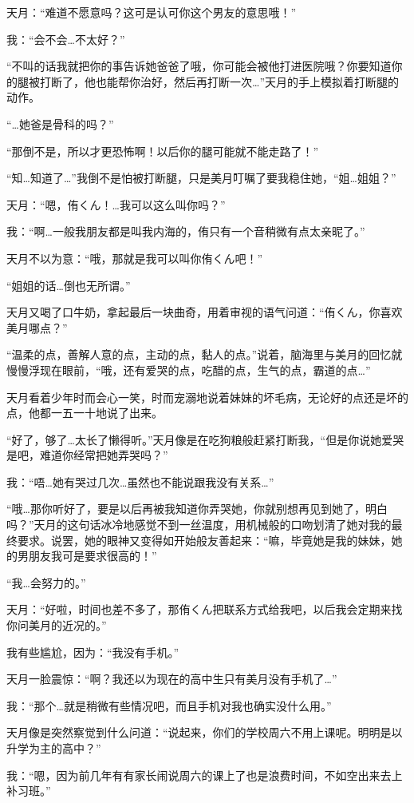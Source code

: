 天月：“难道不愿意吗？这可是认可你这个男友的意思哦！”

我：“会不会…不太好？”

“不叫的话我就把你的事告诉她爸爸了哦，你可能会被他打进医院哦？你要知道你的腿被打断了，他也能帮你治好，然后再打断一次…”天月的手上模拟着打断腿的动作。

“…她爸是骨科的吗？”

“那倒不是，所以才更恐怖啊！以后你的腿可能就不能走路了！”

“知…知道了…”我倒不是怕被打断腿，只是美月叮嘱了要我稳住她，“姐…姐姐？”

天月：“嗯，侑くん！…我可以这么叫你吗？”

我：“啊…一般我朋友都是叫我内海的，侑只有一个音稍微有点太亲昵了。”

天月不以为意：“哦，那就是我可以叫你侑くん吧！”

“姐姐的话…倒也无所谓。”

天月又喝了口牛奶，拿起最后一块曲奇，用着审视的语气问道：“侑くん，你喜欢美月哪点？”

“温柔的点，善解人意的点，主动的点，黏人的点。”说着，脑海里与美月的回忆就慢慢浮现在眼前，“哦，还有爱哭的点，吃醋的点，生气的点，霸道的点…”

天月看着少年时而会心一笑，时而宠溺地说着妹妹的坏毛病，无论好的点还是坏的点，他都一五一十地说了出来。

“好了，够了…太长了懒得听。”天月像是在吃狗粮般赶紧打断我，“但是你说她爱哭是吧，难道你经常把她弄哭吗？”

我：“唔…她有哭过几次…虽然也不能说跟我没有关系…”

“哦…那你听好了，要是以后再被我知道你弄哭她，你就别想再见到她了，明白吗？”天月的这句话冰冷地感觉不到一丝温度，用机械般的口吻划清了她对我的最终要求。说罢，她的眼神又变得如开始般友善起来：“嘛，毕竟她是我的妹妹，她的男朋友我可是要求很高的！”

“我…会努力的。”

天月：“好啦，时间也差不多了，那侑くん把联系方式给我吧，以后我会定期来找你问美月的近况的。”

我有些尴尬，因为：“我没有手机。”

天月一脸震惊：“啊？我还以为现在的高中生只有美月没有手机了…”

我：“那个…就是稍微有些情况吧，而且手机对我也确实没什么用。”

天月像是突然察觉到什么问道：“说起来，你们的学校周六不用上课呢。明明是以升学为主的高中？”

我：“嗯，因为前几年有有家长闹说周六的课上了也是浪费时间，不如空出来去上补习班。”


